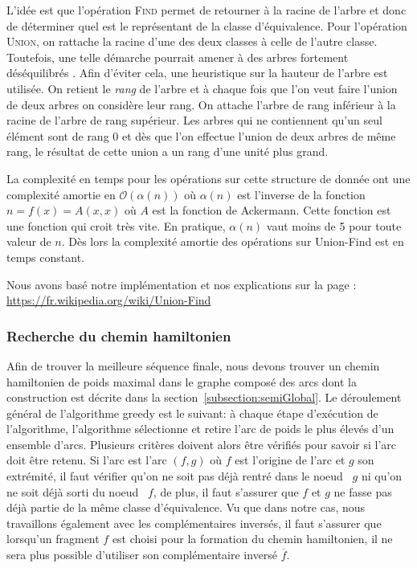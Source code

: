 L'idée est que l'opération \textsc{Find} permet de retourner à la racine de l'arbre et donc de déterminer quel est le représentant de la classe d'équivalence. Pour l'opération \textsc{Union}, on rattache la racine d'une des deux classes à celle de l'autre classe. Toutefois, une telle démarche pourrait amener à des arbres fortement déséquilibrés . Afin d'éviter cela, une heuristique sur la hauteur de l'arbre est utilisée. On retient le \emph{rang} de l'arbre et à chaque fois que l'on veut faire l'union de deux arbres on considère leur rang. On attache l'arbre de rang inférieur à la racine de l'arbre de rang supérieur. Les arbres qui ne contiennent qu'un seul élément sont de rang 0 et dès que l'on effectue l'union de deux arbres de même rang, le résultat de cette union a un rang d'une unité plus grand.

La complexité en temps pour les opérations sur cette structure de donnée ont une complexité amortie en $\mathcal{O}(\alpha (n))$ où $\alpha(n)$ est l'inverse de la fonction $n = f(x) = A(x,x)$ où $A$ est la fonction de Ackermann. Cette fonction est une fonction qui croit très vite. En pratique, $\alpha(n)$ vaut moins de 5 pour toute valeur de $n$. Dès lors la complexité amortie des opérations sur Union-Find est en temps constant.

Nous avons basé notre implémentation et nos explications sur la page : \url{https://fr.wikipedia.org/wiki/Union-Find}
\subsubsection{Recherche du chemin hamiltonien}

Afin de trouver la meilleure séquence finale, nous devons trouver un chemin hamiltonien de poids maximal dans le graphe composé des arcs dont la construction est décrite dans la section~\ref{subsection:semiGlobal}. Le déroulement général de l'algorithme greedy est le suivant: à chaque étape d'exécution de l'algorithme, l'algorithme sélectionne et retire l'arc de poids le plus élevés d'un ensemble d'arcs. Plusieurs critères doivent alors être vérifiés pour savoir si l'arc doit être retenu. Si l'arc est l'arc $(f,g)$ où $f$ est l'origine de l'arc et $g$ son extrémité, il faut vérifier qu'on ne soit pas déjà rentré dans le \og noeud \fg~$g$ ni qu'on ne soit déjà sorti du \og noeud \fg~$f$, de plus, il faut s'assurer que $f$ et $g$ ne fasse pas déjà partie de la même classe d'équivalence. Vu que dans notre cas, nous travaillons également avec les complémentaires inversés, il faut s'assurer que lorsqu'un fragment $f$ est choisi pour la formation du chemin hamiltonien, il ne sera plus possible d'utiliser son complémentaire inversé $\overline{f}$.

